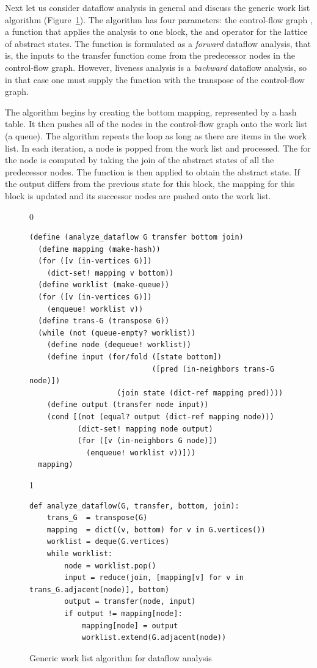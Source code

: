 \documentclass[7x10,nocrop]{TimesAPriori_MIT}%
\def\racketEd{0}
\def\pythonEd{1}
\def\edition{0}
\begin{document}
Next let us consider dataflow analysis in general and discuss the
generic work list algorithm (Figure~\ref{fig:generic-dataflow}). 
%
The algorithm has four parameters: the control-flow graph , a
function  that applies the analysis to one block, the
 and  operator for the lattice of abstract
states. The  function is formulated as a
\emph{forward} dataflow analysis, that is, the inputs to the transfer
function come from the predecessor nodes in the control-flow
graph. However, liveness analysis is a \emph{backward} dataflow
analysis, so in that case one must supply the 
function with the transpose of the control-flow graph.

The algorithm begins by creating the bottom mapping, represented by a
hash table.  It then pushes all of the nodes in the control-flow graph
onto the work list (a queue). The algorithm repeats the 
loop as long as there are items in the work list. In each iteration, a
node is popped from the work list and processed. The  for
the node is computed by taking the join of the abstract states of all
the predecessor nodes. The  function is then applied to
obtain the  abstract state. If the output differs from
the previous state for this block, the mapping for this block is
updated and its successor nodes are pushed onto the work list.


\begin{figure}[tb]
{\if\edition\racketEd    
\begin{lstlisting}
(define (analyze_dataflow G transfer bottom join)
  (define mapping (make-hash))
  (for ([v (in-vertices G)])
    (dict-set! mapping v bottom))
  (define worklist (make-queue))
  (for ([v (in-vertices G)])
    (enqueue! worklist v))
  (define trans-G (transpose G))
  (while (not (queue-empty? worklist))
    (define node (dequeue! worklist)) 
    (define input (for/fold ([state bottom])
                            ([pred (in-neighbors trans-G node)])
                    (join state (dict-ref mapping pred))))
    (define output (transfer node input))
    (cond [(not (equal? output (dict-ref mapping node)))
           (dict-set! mapping node output)
           (for ([v (in-neighbors G node)])
             (enqueue! worklist v))]))
  mapping)
\end{lstlisting}
\fi}
{\if\edition\pythonEd
\begin{lstlisting}
def analyze_dataflow(G, transfer, bottom, join):
    trans_G  = transpose(G)
    mapping  = dict((v, bottom) for v in G.vertices())
    worklist = deque(G.vertices)
    while worklist:
        node = worklist.pop()
        input = reduce(join, [mapping[v] for v in trans_G.adjacent(node)], bottom)
        output = transfer(node, input)
        if output != mapping[node]:
            mapping[node] = output
            worklist.extend(G.adjacent(node))
\end{lstlisting}
\fi}
\caption{Generic work list algorithm for dataflow analysis}
  \label{fig:generic-dataflow}
\end{figure}
\end{document}
